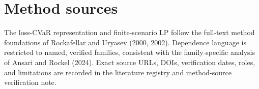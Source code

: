 \documentclass[11pt]{article}
\theoremstyle{definition}
\begin{document}
\section*{Method sources}

The loss-CVaR representation and finite-scenario LP follow the full-text
method foundations of Rockafellar and Uryasev (2000, 2002).  Dependence
language is restricted to named, verified families, consistent with the
family-specific analysis of Ansari and Rockel (2024).  Exact source URLs,
DOIs, verification dates, roles, and limitations are recorded in the
literature registry and method-source verification note.
\end{document}
